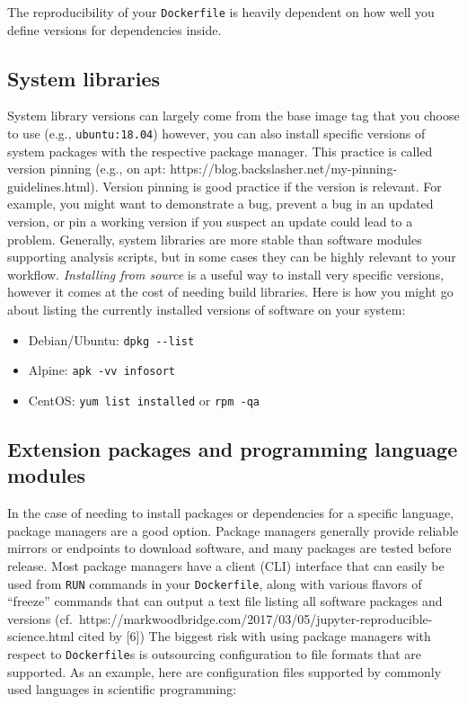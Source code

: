 \documentclass[10pt,letterpaper]{article}
\providecommand{\tightlist}{%
  \setlength{\itemsep}{0pt}\setlength{\parskip}{0pt}}
\begin{document}
The reproducibility of your \texttt{Dockerfile} is heavily dependent on
how well you define versions for dependencies inside.

\hypertarget{system-libraries}{%
\subsection{System libraries}\label{system-libraries}}

System library versions can largely come from the base image tag that
you choose to use (e.g., \texttt{ubuntu:18.04}) however, you can also
install specific versions of system packages with the respective package
manager. This practice is called version pinning (e.g., on apt:
https://blog.backslasher.net/my-pinning-guidelines.html). Version
pinning is good practice if the version is relevant. For example, you
might want to demonstrate a bug, prevent a bug in an updated version, or
pin a working version if you suspect an update could lead to a problem.
Generally, system libraries are more stable than software modules
supporting analysis scripts, but in some cases they can be highly
relevant to your workflow. \emph{Installing from source} is a useful way
to install very specific versions, however it comes at the cost of
needing build libraries. Here is how you might go about listing the
currently installed versions of software on your system:

\begin{itemize}
\tightlist
\item
  Debian/Ubuntu: \texttt{dpkg\ -\/-list}
\item
  Alpine: \texttt{apk\ -vv\ info\textbar{}sort}
\item
  CentOS: \texttt{yum\ list\ installed} or \texttt{rpm\ -qa}
\end{itemize}

\hypertarget{extension-packages-and-programming-language-modules}{%
\subsection{Extension packages and programming language
modules}\label{extension-packages-and-programming-language-modules}}

In the case of needing to install packages or dependencies for a
specific language, package managers are a good option. Package managers
generally provide reliable mirrors or endpoints to download software,
and many packages are tested before release. Most package managers have
a client (CLI) interface that can easily be used from \texttt{RUN}
commands in your \texttt{Dockerfile}, along with various flavors of
``freeze'' commands that can output a text file listing all software
packages and versions
(cf.~https://markwoodbridge.com/2017/03/05/jupyter-reproducible-science.html
cited by {[}6{]}) The biggest risk with using package managers with
respect to \texttt{Dockerfile}s is outsourcing configuration to file
formats that are supported. As an example, here are configuration files
supported by commonly used languages in scientific programming:
\end{document}
